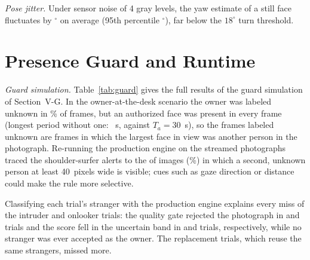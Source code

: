 \documentclass[journal]{IEEEtran}
\begin{document}
\emph{Pose jitter.} Under sensor noise of 4 gray levels, the yaw estimate of a still face fluctuates by \poseJitter$^\circ$ on average (95th percentile \poseJitterQ$^\circ$), far below the $18^\circ$ turn threshold.

\section{Presence Guard and Runtime}\label{sec:s-guard}

\emph{Guard simulation.} Table~\ref{tab:guard} gives the full results of the guard simulation of Section~V-G. In the owner-at-the-desk scenario the owner was labeled unknown in \gUnknownFrac\% of frames, but an authorized face was present in every frame (longest period without one: \gLongestGap~s, against $T_a=30$~s), so the frames labeled unknown are frames in which the largest face in view was another person in the photograph. Re-running the production engine on the streamed photographs traced the \gShldAlerts{} shoulder-surfer alerts to the \gdSecond{} of \gdPhotos{} images (\gdSecondPct\%) in which a second, unknown person at least 40~pixels wide is visible; cues such as gaze direction or distance could make the rule more selective.

Classifying each trial's stranger with the production engine explains every miss of the intruder and onlooker trials: the quality gate rejected the photograph in \gdIntrQuality{} and \gdShldQuality{} trials and the score fell in the uncertain band in \gdIntrUncertain{} and \gdShldUncertain{} trials, respectively, while no stranger was ever accepted as the owner. The replacement trials, which reuse the same strangers, missed \gReplExtra{} more.
\end{document}
